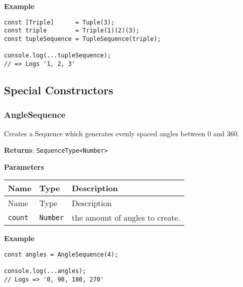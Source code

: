 \textbf{Example}

\begin{lstlisting}[label=d339d35f-afff-4109-a8f7-348b7f8d90b4]
const [Triple]      = Tuple(3);
const triple        = Triple(1)(2)(3);
const tupleSequence = TupleSequence(triple);
                                            
console.log(...tupleSequence);
// => Logs '1, 2, 3'
\end{lstlisting}

\hypertarget{ed041adb-4774-4c16-a585-05c2eaf8e235}{%
\subsection{Special Constructors}\label{sub:appendix_special_constructors}}


\hypertarget{68f6afbc-de45-4843-9b8c-ab5ca8806c10}{%
\subsubsection{AngleSequence}\label{68f6afbc-de45-4843-9b8c-ab5ca8806c10}}

Creates a Sequence which generates evenly spaced angles between 0 and
360.

\textbf{Returns}: \passthrough{\lstinline!SequenceType<Number>!}

\textbf{Parameters}

\begin{longtable}[]{
  >{\raggedright\arraybackslash}p{}
  >{\raggedright\arraybackslash}p{}
  >{\raggedright\arraybackslash}p{}@{}}

\toprule\noalign{}
Name & Type & Description \\
\midrule\noalign{}
\endfirsthead
\toprule\noalign{}
Name & Type & Description \\
\midrule\noalign{}
\endhead
\bottomrule\noalign{}
\endlastfoot
\passthrough{\lstinline!count!} & \passthrough{\lstinline!Number!} & the
amount of angles to create. \\
\end{longtable}

\textbf{Example}

\begin{lstlisting}[label=b94dc362-c081-4bfa-9d61-5c838e57a755]
const angles = AngleSequence(4);
                                
console.log(...angles);
// Logs => '0, 90, 180, 270'
\end{lstlisting}


